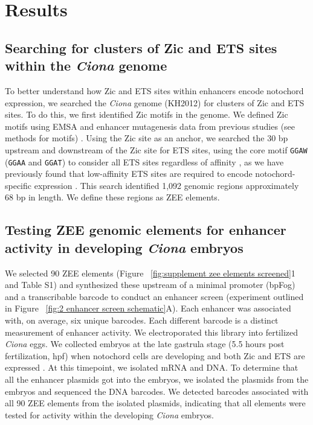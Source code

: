 \section{Results}

\subsection{Searching for clusters of Zic and ETS sites within the \textit{Ciona} genome}

To better understand how Zic and ETS sites within enhancers encode notochord expression, we searched the \textit{Ciona} genome (KH2012) for clusters of Zic and ETS sites. To do this, we first identified Zic motifs in the genome. We defined Zic motifs using EMSA and enhancer mutagenesis data from previous studies (see methods for motifs) \cite{matsumoto2007a,takahashi1999,yagi2004}. Using the Zic site as an anchor, we searched the 30 bp upstream and downstream of  the Zic site for ETS sites, using the core motif \verb|GGAW| (\verb|GGAA| and \verb|GGAT|) to consider all ETS sites regardless of affinity \cite{lamber2008,wei2010}, as we have previously found that low-affinity ETS sites are required to encode notochord-specific expression \cite{farley2016}. This search identified 1,092 genomic regions approximately 68 bp in length. We define these regions as ZEE elements. 

\subsection{Testing ZEE genomic elements for enhancer activity in developing \textit{Ciona} embryos}

We selected 90 ZEE elements (Figure ~\ref{fig:supplement zee elements screened}1 and Table S1) and synthesized these upstream of a minimal promoter (bpFog) \cite{rothbacher2007,stolfi2015} and a transcribable barcode to conduct an enhancer screen (experiment outlined in Figure ~\ref{fig:2 enhancer screen schematic}A). Each enhancer was associated with, on average, six unique barcodes. Each different barcode is a distinct measurement of enhancer activity. We electroporated this library into fertilized \textit{Ciona} eggs. We collected embryos at the late gastrula stage (5.5 hours post fertilization, hpf) when notochord cells are developing \cite{jiang2007} and both Zic and ETS are expressed \cite{imai2004,winkley2021}. At this timepoint, we isolated mRNA and DNA. To determine that all the enhancer plasmids got into the embryos, we isolated the plasmids from the embryos and sequenced the DNA barcodes. We detected barcodes associated with all 90 ZEE elements from the isolated plasmids, indicating that all elements were tested for activity within the developing \textit{Ciona} embryos. 

